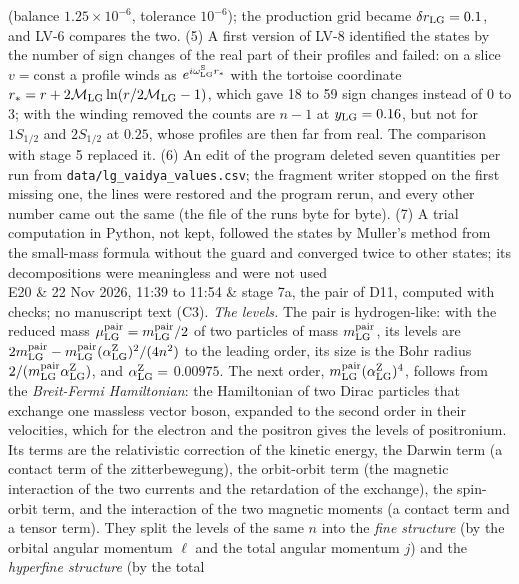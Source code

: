 \documentclass[
  10pt,
]{article}
\begin{document}
\begin{longtable}[]
(balance \(1.25\times10^{-6}\), tolerance \(10^{-6}\)); the production
grid became \(\delta r_{\rm LG}=0.1\), and LV-6 compares the two. (5) A
first version of LV-8 identified the states by the number of sign
changes of the real part of their profiles and failed: on a slice
\(v=\text{const}\) a profile winds as
\(e^{i\omega^{\rm S}_{\rm LG}r_*}\) with the tortoise coordinate
\(r_*=r+2\mathcal M_{\rm LG}\ln(r/2\mathcal M_{\rm LG}-1)\), which gave
18 to 59 sign changes instead of 0 to 3; with the winding removed the
counts are \(n-1\) at \(y_{\rm LG}=0.16\), but not for \(1S_{1/2}\) and
\(2S_{1/2}\) at \(0.25\), whose profiles are then far from real. The
comparison with stage 5 replaced it. (6) An edit of the program deleted
seven quantities per run from \texttt{data/lg\_vaidya\_values.csv}; the
fragment writer stopped on the first missing one, the lines were
restored and the program rerun, and every other number came out the same
(the file of the runs byte for byte). (7) A trial computation in Python,
not kept, followed the states by Muller's method from the small-mass
formula without the guard and converged twice to other states; its
decompositions were meaningless and were not used \\
E20 & 22 Nov 2026, 11:39 to 11:54 & stage 7a, the pair of D11, computed
with checks; no manuscript text (C3). \emph{The levels.} The pair is
hydrogen-like: with the reduced mass
\(\mu^{\rm pair}_{\rm LG}=m^{\rm pair}_{\rm LG}/2\) of two particles of
mass \(m^{\rm pair}_{\rm LG}\), its levels are
\(2m^{\rm pair}_{\rm LG}-m^{\rm pair}_{\rm LG}(\alpha^{\rm Z}_{\rm LG})^2/(4n^2)\)
to the leading order, its size is the Bohr radius
\(2/(m^{\rm pair}_{\rm LG}\alpha^{\rm Z}_{\rm LG})\), and
\(\alpha^{\rm Z}_{\rm LG}=\) \(0.00975\). The next order,
\(m^{\rm pair}_{\rm LG}(\alpha^{\rm Z}_{\rm LG})^4\), follows from the
\emph{Breit-Fermi Hamiltonian}: the Hamiltonian of two Dirac particles
that exchange one massless vector boson, expanded to the second order in
their velocities, which for the electron and the positron gives the
levels of positronium. Its terms are the relativistic correction of the
kinetic energy, the Darwin term (a contact term of the zitterbewegung),
the orbit-orbit term (the magnetic interaction of the two currents and
the retardation of the exchange), the spin-orbit term, and the
interaction of the two magnetic moments (a contact term and a tensor
term). They split the levels of the same \(n\) into the \emph{fine
structure} (by the orbital angular momentum \(\ell\) and the total
angular momentum \(j\)) and the \emph{hyperfine structure} (by the total

\end{longtable}
\end{document}
